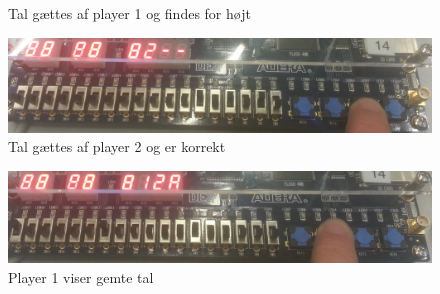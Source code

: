 \begin{enumerate}
\begin{figure}[h]
			\caption{Tal gættes af player 1 og findes for højt}
			\label{fig:Guess2pTryHi}
		\end{figure}
		\begin{figure}[h]
			\centering
			\includegraphics[scale=0.15]{pictures/Oevelse5/opg3/guess_2p_try_ok.JPG}
			\caption{Tal gættes af player 2 og er korrekt}
			\label{fig:Guess2pTryOk}
		\end{figure}
		\begin{figure}[h]
			\centering
			\includegraphics[scale=0.15]{pictures/Oevelse5/opg3/guess_2p_show.JPG}
			\caption{Player 1 viser gemte tal}
			\label{fig:Guess2pShow}
		\end{figure}
\end{enumerate}